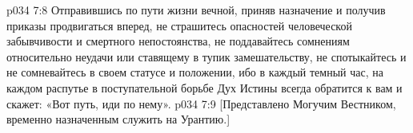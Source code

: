 \vs p034 7:8 \pc Отправившись по пути жизни вечной, приняв назначение и получив приказы продвигаться вперед, не страшитесь опасностей человеческой забывчивости и смертного непостоянства, не поддавайтесь сомнениям относительно неудачи или ставящему в тупик замешательству, не спотыкайтесь и не сомневайтесь в своем статусе и положении, ибо в каждый темный час, на каждом распутье в поступательной борьбе Дух Истины всегда обратится к вам и скажет: «Вот путь, иди по нему».
\vsetoff
\vs p034 7:9 [Представлено Могучим Вестником, временно назначенным служить на Урантию.]
